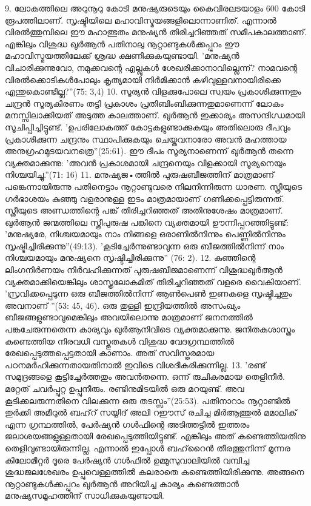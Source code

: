 9. ലോകത്തിലെ അറുനൂറു കോടി മനുഷ്യരുടെയും കൈവിരലടയാളം 600 കോടി രൂപത്തിലാണ്. സൃഷ്ടിയിലെ മഹാവിസ്മയങ്ങളിലൊന്നാണിത്. എന്നാല്‍ വിരല്‍ത്തുമ്പിലെ ഈ മഹാത്ഭുതം മനുഷ്യന്‍ തിരിച്ചറിഞ്ഞത് സമീപകാലത്താണ്. എങ്കിലും വിശുദ്ധ ഖുര്‍ആന്‍ പതിനാലു നൂറ്റാണ്ടുകള്‍ക്കപ്പുറം ഈ മഹാവിസ്മയത്തിലേക്ക് ശ്രദ്ധ ക്ഷണിക്കുകയുണ്ടായി. 'മനുഷ്യന്‍ വിചാരിക്കുന്നുവോ, നമുക്കവന്റെ എല്ലുകള്‍ ശേഖരിക്കാനാവില്ലെന്ന്? നാമവന്റെ വിരല്‍ക്കൊടികള്‍പോലും കൃത്യമായി നിര്‍മിക്കാന്‍ കഴിവുള്ളവനായിരിക്കെ എന്തുകൊണ്ടില്ല?''(75: 3,4)
10. സൂര്യന്‍ വിളക്കുപോലെ സ്വയം പ്രകാശിക്കുന്നതും ചന്ദ്രന്‍ സൂര്യകിരണം തട്ടി പ്രകാശം പ്രതിബിംബിക്കുന്നതുമാണെന്ന് ലോകം മനസ്സിലാക്കിയത് അടുത്ത കാലത്താണ്. ഖുര്‍ആന്‍ ഇക്കാര്യം അസന്ദിഗ്ധമായി സൂചിപ്പിച്ചിട്ടുണ്ട്. 'ഉപരിലോകത്ത് കോട്ടകളുണ്ടാക്കുകയും അതിലൊരു ദീപവും പ്രകാശിക്കുന്ന ചന്ദ്രനും സ്ഥാപിക്കുകയും ചെയ്തവനാരോ അവന്‍ മഹത്തായ അനുഗ്രഹമുടയവനത്രെ''(25:61).
ഈ ദീപം സൂര്യനാണെന്ന് ഖുര്‍ആന്‍ തന്നെ വ്യക്തമാക്കുന്നു: 'അവന്‍ പ്രകാശമായി ചന്ദ്രനെയും വിളക്കായി സൂര്യനെയും നിശ്ചയിച്ചു.''(71: 16)
11. മനുഷ്യജ•ത്തില്‍ പുരുഷബീജത്തിന് മാത്രമാണ് പങ്കെന്നായിരുന്നു പതിനെട്ടാം നൂറ്റാണ്ടുവരെ നിലനിന്നിരുന്ന ധാരണ. സ്ത്രീയുടെ ഗര്‍ഭാശയം കുഞ്ഞു വളരാനുള്ള ഇടം മാത്രമായാണ് ഗണിക്കപ്പെട്ടിരുന്നത്. സ്ത്രീയുടെ അണ്ഡത്തിന്റെ പങ്ക് തിരിച്ചറിഞ്ഞത് അതിനുശേഷം മാത്രമാണ്. ഖുര്‍ആന്‍ ജന്മത്തിലെ സ്ത്രീപുരുഷ പങ്കിനെ വ്യക്തമായി ഊന്നിപ്പറഞ്ഞിട്ടുണ്ട്: 'മനുഷ്യരേ, നിശ്ചയമായും നാം നിങ്ങളെ ഒരാണില്‍നിന്നും പെണ്ണില്‍നിന്നും സൃഷ്ടിച്ചിരിക്കുന്നു''(49:13). 'കൂടിച്ചേര്‍ന്നുണ്ടാവുന്ന ഒരു ബീജത്തില്‍നിന്ന് നാം നിശ്ചയമായും മനുഷ്യനെ സൃഷ്ടിച്ചിരിക്കുന്നു'' (76: 2).
12. കുഞ്ഞിന്റെ ലിംഗനിര്‍ണയം നിര്‍വഹിക്കുന്നത് പുരുഷബീജമാണെന്ന് വിശുദ്ധഖുര്‍ആന്‍ വ്യക്തമാക്കിയെങ്കിലും ശാസ്ത്രലോകമിത് തിരിച്ചറിഞ്ഞത് വളരെ വൈകിയാണ്. 'സ്രവിക്കപ്പെടുന്ന ഒരു ബീജത്തില്‍നിന്ന് ആണ്‍പെണ്‍ ഇണകളെ സൃഷ്ടിച്ചതും അവനാണ് ''(53: 45, 46).
ഒരു തുള്ളി ഇന്ദ്രിയത്തില്‍ അസംഖ്യം ബീജങ്ങളുണ്ടാവുമെങ്കിലും അവയിലൊന്നു മാത്രമാണ് ജനനത്തില്‍ പങ്കുചേരുന്നതെന്ന കാര്യവും ഖുര്‍ആനിവിടെ വ്യക്തമാക്കുന്നു. ജനിതകശാസ്ത്രം കണ്ടെത്തിയ നിരവധി വസ്തുതകള്‍ വിശുദ്ധ വേദഗ്രന്ഥത്തില്‍ രേഖപ്പെടുത്തപ്പെട്ടതായി കാണാം. അത് സവിസ്തരമായ പഠനമര്‍ഹിക്കുന്നതായതിനാല്‍ ഇവിടെ വിശദീകരിക്കുന്നില്ല.
13. 'രണ്ട് സമുദ്രങ്ങളെ കൂട്ടിച്ചേര്‍ത്തതും അവന്‍തന്നെ. ഒന്ന് രുചികരമായ തെളിനീര്‍. മറ്റേത് ചവര്‍പ്പുറ്റ ഉപ്പുനീരും. രണ്ടിനുമിടയില്‍ ഒരു മറയുണ്ട്. അവ കൂടിക്കലരുന്നതിനെ വിലക്കുന്ന ഒരു തടസ്സം''(25:53).
പതിനാറാം നൂറ്റാണ്ടില്‍ തുര്‍ക്കി അമീറുല്‍ ബഹ്‌റ് സയ്യിദ് അലി റഈസ് രചിച്ച മിര്‍ആത്തുല്‍ മമാലിക് എന്ന ഗ്രന്ഥത്തില്‍, പേര്‍ഷ്യന്‍ ഗള്‍ഫിന്റെ അടിത്തട്ടില്‍ ഇത്തരം ജലാശയങ്ങളുള്ളതായി രേഖപ്പെടുത്തിയിട്ടുണ്ട്. എങ്കിലും അത് കണ്ടെത്തിയതിനു തെളിവുണ്ടായിരുന്നില്ല. എന്നാല്‍ ഇപ്പോള്‍ ബഹ്‌റൈന്‍ തീരത്തുനിന്ന് മൂന്നര കിലോമീറ്റര്‍ ദൂരെ പേര്‍ഷ്യന്‍ ഗള്‍ഫില്‍ ഉമ്മുസുവാലിയില്‍ വമ്പിച്ച ശുദ്ധജലശേഖരം ഉപ്പുവെള്ളത്തില്‍ കലരാതെ കണ്ടെത്തിയിരിക്കുന്നു. അങ്ങനെ നൂറ്റാണ്ടുകള്‍ക്കപ്പുറം ഖുര്‍ആന്‍ അറിയിച്ച കാര്യം കണ്ടെത്താന്‍ മനുഷ്യസമൂഹത്തിന് സാധിക്കുകയുണ്ടായി.
